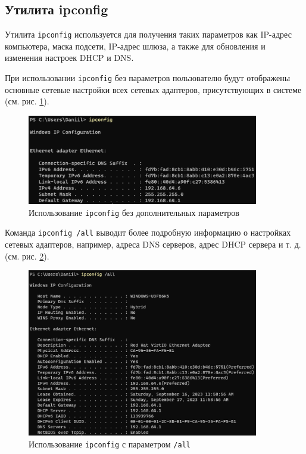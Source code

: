 \documentclass[a4paper, 14pt]{extarticle}
\begin{document}
\subsection{Утилита ipconfig}

Утилита \texttt{ipconfig} используется для получения таких параметров как
IP-адрес компьютера, маска подсети, IP-адрес шлюза, а также для обновления и
изменения настроек DHCP и DNS.

При использовании \texttt{ipconfig} без параметров пользователю будут
отображены основные сетевые настройки всех сетевых адаптеров, присутствующих в
системе (см. рис. \ref{fig:ipconfig-default}).

\begin{figure}[H]
  \centering
  \includegraphics[width=0.9\textwidth]{images/ipconfig/default.png}
  \caption{Использование \texttt{ipconfig} без дополнительных параметров}
  \label{fig:ipconfig-default}
\end{figure}

Команда \texttt{ipconfig /all} выводит более подробную информацию о настройках
сетевых адаптеров, например, адреса DNS серверов, адрес DHCP сервера и т. д.
(см. рис. \ref{fig:ipconfig-all}).

\begin{figure}[H]
  \centering
  \includegraphics[width=0.9\textwidth]{images/ipconfig/all.png}
  \caption{Использование \texttt{ipconfig} с параметром \texttt{/all}}
  \label{fig:ipconfig-all}
\end{figure}
\end{document}

